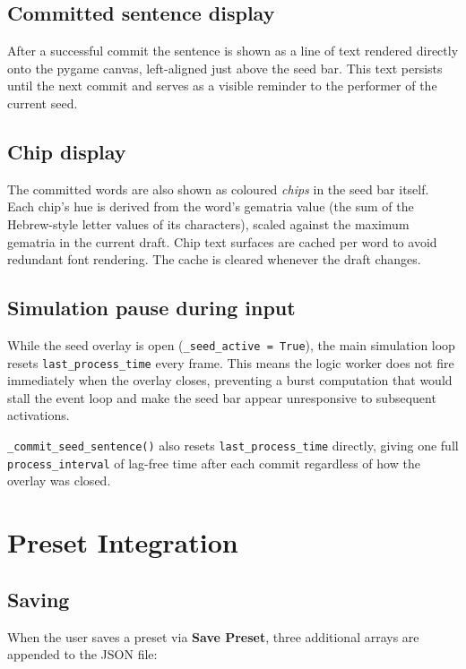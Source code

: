 \documentclass[11pt,a4paper]{report}
\begin{document}
\section{Committed sentence display}

After a successful commit the sentence is shown as a line of text rendered
directly onto the pygame canvas, left-aligned just above the seed bar.  This
text persists until the next commit and serves as a visible reminder to the
performer of the current seed.

\section{Chip display}

The committed words are also shown as coloured \emph{chips} in the seed bar
itself.  Each chip's hue is derived from the word's gematria value (the sum
of the Hebrew-style letter values of its characters), scaled against the
maximum gematria in the current draft.  Chip text surfaces are cached
per word to avoid redundant font rendering.  The cache is cleared whenever
the draft changes.

\section{Simulation pause during input}

While the seed overlay is open (\texttt{\_seed\_active = True}), the main
simulation loop resets \texttt{last\_process\_time} every frame.  This means
the logic worker does not fire immediately when the overlay closes, preventing
a burst computation that would stall the event loop and make the seed bar
appear unresponsive to subsequent activations.

\texttt{\_commit\_seed\_sentence()} also resets \texttt{last\_process\_time}
directly, giving one full \texttt{process\_interval} of lag-free time after
each commit regardless of how the overlay was closed.

\chapter{Preset Integration}

\section{Saving}

When the user saves a preset via \textbf{Save Preset}, three additional
arrays are appended to the JSON file:
\end{document}
